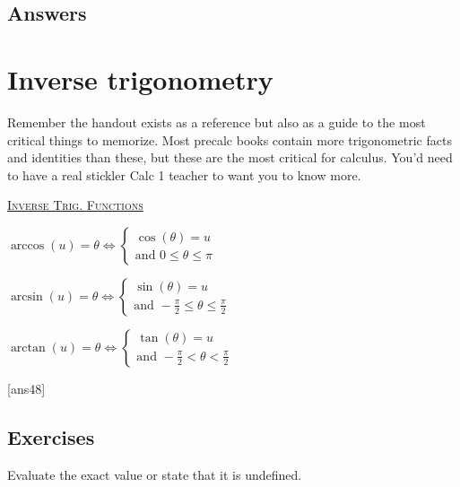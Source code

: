 \documentclass{amsbook}
\numberwithin{section}{chapter}
\numberwithin{equation}{chapter}
\begin{document}
\subsection*{Answers \nopunct} \hfill
\begin{multicols}{2}
	
\end{multicols}

\newpage
\section{Inverse trigonometry}

 Remember the handout exists as a reference but also as a guide to the most critical things to memorize. Most precalc books contain more trigonometric facts and identities than these, but these are the most critical for calculus. You'd need to have a real stickler Calc 1 teacher to want you to know more.
 
 \underline{\textsc{Inverse Trig. Functions}}
 
 \medskip
 $\arccos(u)=\theta \iff
 \left\{
 \begin{array}{l}
 \cos(\theta)=u\\
 \text{and } 0 \leq \theta \leq \pi
 \end{array}
 \right.
 $
 
 \medskip
 $\arcsin(u)=\theta \iff
 \left\{
 \begin{array}{l}
 \sin(\theta)=u\\
 \text{and } -\frac{\pi}{2} \leq \theta \leq \frac{\pi}{2}
 \end{array}
 \right.
 $
 
 \medskip
 $\arctan(u)=\theta \iff
 \left\{
 \begin{array}{l}
 \tan(\theta)=u\\
 \text{and } -\frac{\pi}{2} < \theta < \frac{\pi}{2}
 \end{array}
 \right.
 $
 
 [ans48]
 \subsection*{Exercises \nopunct} \hfill
 
 Evaluate the exact value or state that it is undefined.
 
\end{document}
